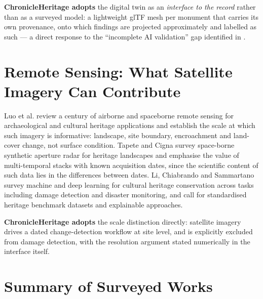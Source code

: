 \documentclass[a4paper,12pt,oneside]{book}
\begin{document}
\textbf{ChronicleHeritage adopts} the digital twin as an \textit{interface to the record} rather than as a surveyed model: a lightweight glTF mesh per monument that carries its own provenance, onto which findings are projected approximately and labelled as such --- a direct response to the ``incomplete AI validation'' gap identified in \cite{tootoonchi2026dt}.

\section{Remote Sensing: What Satellite Imagery Can Contribute}
Luo et al. \cite{luo2019remote} review a century of airborne and spaceborne remote sensing for archaeological and cultural heritage applications and establish the scale at which such imagery is informative: landscape, site boundary, encroachment and land-cover change, not surface condition. Tapete and Cigna \cite{tapete2017sar} survey space-borne synthetic aperture radar for heritage landscapes and emphasise the value of multi-temporal stacks with known acquisition dates, since the scientific content of such data lies in the differences between dates. Li, Chiabrando and Sammartano \cite{li2026review} survey machine and deep learning for cultural heritage conservation across tasks including damage detection and disaster monitoring, and call for standardised heritage benchmark datasets and explainable approaches.

\textbf{ChronicleHeritage adopts} the scale distinction directly: satellite imagery drives a dated change-detection workflow at site level, and is explicitly excluded from damage detection, with the resolution argument stated numerically in the interface itself.

\section{Summary of Surveyed Works}
\end{document}
